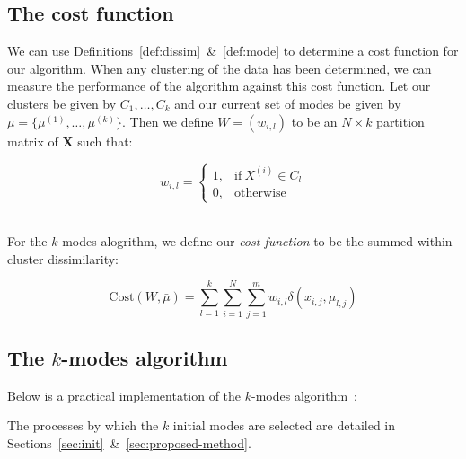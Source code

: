 \subsection{The cost function}\label{subsec:cost}

We can use Definitions~\ref{def:dissim}~\&~\ref{def:mode} to determine a cost 
function for our algorithm. When any clustering of the data has been determined,
we can measure the performance of the algorithm against this cost function. Let
our clusters be given by \(C_1, \ldots, C_k\) and our current set of modes be
given by \(\bar{\mu} = \{\mu^{(1)}, \ldots, \mu^{(k)}\}\). Then we define \(W =
(w_{i, l})\) to be an \(N \times k\) partition matrix of \textbf{X} such that:

\[ 
    w_{i,l} = \begin{cases}
                1, & \text{if} \ X^{(i)} \in C_l \\
                0, & \text{otherwise}
              \end{cases}
\]\\

\begin{definition}\label{def:cost}
    For the \(k\)-modes alogrithm, we define our \emph{cost function} to be the 
    summed within-cluster dissimilarity:

    \[
        \text{Cost}(W, \bar{\mu}) = \sum_{l=1}^{k} \sum_{i=1}^{N} \sum_{j=1}^{m}
        w_{i,l} \delta(x_{i,j}, \mu_{l,j})
    \]
\end{definition}


\subsection{The \(k\)-modes algorithm}\label{subsec:kmodes}

Below is a practical implementation of the \(k\)-modes algorithm~\cite{Huang98}:


\vspace{-5pt}

\begin{remark}
    The processes by which the \(k\) initial modes are selected are detailed in 
    Sections~\ref{sec:init}~\&~\ref{sec:proposed-method}.
\end{remark}

